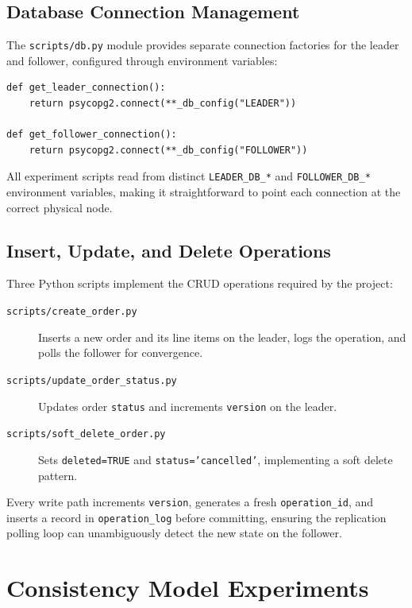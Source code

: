 \documentclass[12pt,a4paper]{article}
\begin{document}
\subsection{Database Connection Management}

The \texttt{scripts/db.py} module provides separate connection factories for
the leader and follower, configured through environment variables:

\begin{lstlisting}[style=pythonstyle, caption={Leader/follower connection factories (db.py)}]
def get_leader_connection():
    return psycopg2.connect(**_db_config("LEADER"))

def get_follower_connection():
    return psycopg2.connect(**_db_config("FOLLOWER"))
\end{lstlisting}

All experiment scripts read from distinct \texttt{LEADER\_DB\_*} and
\texttt{FOLLOWER\_DB\_*} environment variables, making it straightforward
to point each connection at the correct physical node.

\subsection{Insert, Update, and Delete Operations}

Three Python scripts implement the CRUD operations required by the project:

\begin{description}    \item[\texttt{scripts/create\_order.py}] Inserts a new order and its line items
        on the leader, logs the operation, and polls the follower for convergence.
    \item[\texttt{scripts/update\_order\_status.py}] Updates order \texttt{status}
        and increments \texttt{version} on the leader.
    \item[\texttt{scripts/soft\_delete\_order.py}] Sets \texttt{deleted=TRUE} and
        \texttt{status='cancelled'}, implementing a soft delete pattern.
\end{description}

Every write path increments \texttt{version}, generates a fresh \texttt{operation\_id},
and inserts a record in \texttt{operation\_log} before committing, ensuring
the replication polling loop can unambiguously detect the new state on the follower.

\section{Consistency Model Experiments}
\end{document}
